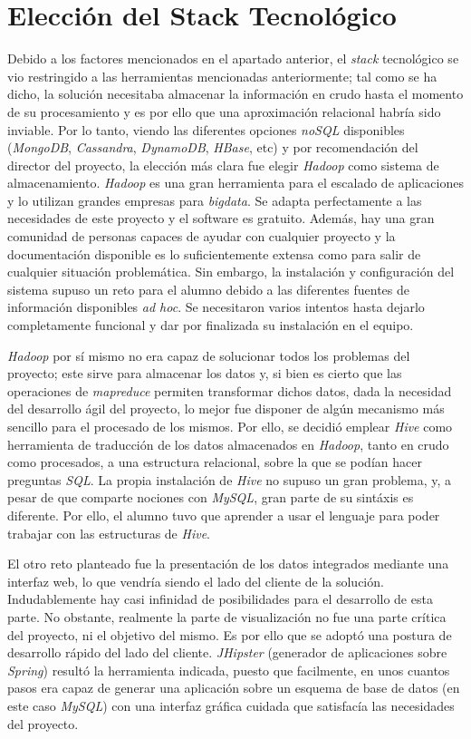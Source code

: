 \section{Elección del Stack Tecnológico}  \label{analisis.stack}
Debido a los factores mencionados en el apartado anterior, el \textit{stack} tecnológico se vio restringido a las herramientas mencionadas anteriormente; tal como se ha dicho, la solución necesitaba almacenar la información en crudo hasta el momento de su procesamiento y es por ello que una aproximación relacional habría sido inviable. Por lo tanto, viendo las diferentes opciones \textit{noSQL} disponibles (\textit{MongoDB}, \textit{Cassandra}, \textit{DynamoDB}, \textit{HBase}, etc) y por recomendación del director del proyecto, la elección más clara fue elegir \textit{Hadoop} como sistema de almacenamiento. \textit{Hadoop} es una gran herramienta para el escalado de aplicaciones y lo utilizan grandes empresas para \textit{\gls{bigdata}}. Se adapta perfectamente a las necesidades de este proyecto y el software es gratuito. Además, hay una gran comunidad de personas capaces de ayudar con cualquier proyecto y la documentación disponible es lo suficientemente extensa como para salir de cualquier situación problemática. Sin embargo, la instalación y configuración del sistema supuso un reto para el alumno debido a las diferentes fuentes de información disponibles \textit{ad hoc}. Se necesitaron varios intentos hasta dejarlo completamente funcional y dar por finalizada su instalación en el equipo. \par
\textit{Hadoop} por sí mismo no era capaz de solucionar todos los problemas del proyecto; este sirve para almacenar los datos y, si bien es cierto que las operaciones de \textit{\gls{mapreduce}} permiten transformar dichos datos, dada la necesidad del desarrollo ágil del proyecto, lo mejor fue disponer de algún mecanismo más sencillo para el procesado de los mismos. Por ello, se decidió emplear \textit{Hive} como herramienta de traducción de los datos almacenados en \textit{Hadoop}, tanto en crudo como procesados, a una estructura relacional, sobre la que se podían hacer preguntas \textit{SQL}. La propia instalación de \textit{Hive} no supuso un gran problema, y, a pesar de que comparte  nociones con \textit{MySQL}, gran parte de su sintáxis es diferente. Por ello, el alumno tuvo que aprender a usar el lenguaje para poder trabajar con las estructuras de \textit{Hive}.\par
El otro reto planteado fue la presentación de los datos integrados mediante una interfaz web, lo que vendría siendo el lado del cliente de la solución. Indudablemente hay casi infinidad de posibilidades para el desarrollo de esta parte. No obstante, realmente la parte de visualización no fue una parte crítica del proyecto, ni el objetivo del mismo. Es por ello que se adoptó una postura de desarrollo rápido del lado del cliente. \textit{JHipster} (generador de aplicaciones sobre \textit{Spring}) resultó la herramienta indicada, puesto que facilmente, en unos cuantos pasos era capaz de generar una aplicación sobre un esquema de base de datos (en este caso \textit{MySQL}) con una interfaz gráfica cuidada que satisfacía las necesidades del proyecto. 
